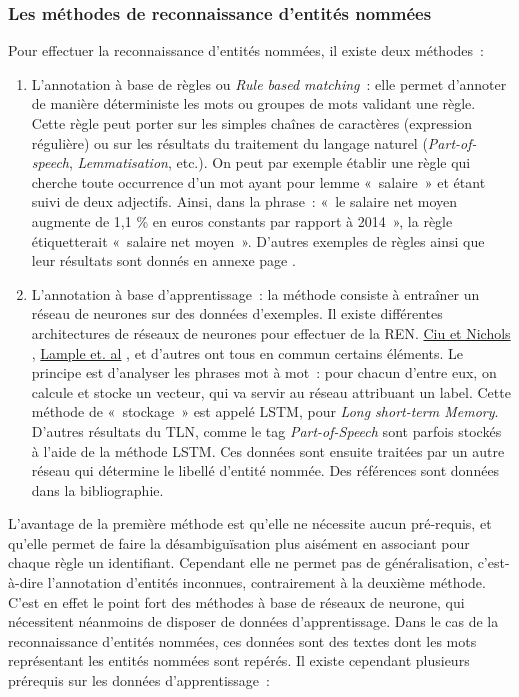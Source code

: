 \subsubsection*{Les méthodes de reconnaissance d'entités nommées}
Pour effectuer la reconnaissance d'entités nommées, il existe deux méthodes~: 
\begin{enumerate}
    \item L'annotation à base de règles ou \textit{Rule based matching}~: elle permet d'annoter de manière déterministe les mots ou groupes de mots validant une règle. Cette règle peut porter sur les simples chaînes de caractères (expression régulière) ou sur les résultats du traitement du langage naturel (\textit{Part-of-speech}, \textit{Lemmatisation}, etc.). On peut par exemple établir une règle qui cherche toute occurrence d'un mot ayant pour lemme «~salaire~» et étant suivi de deux adjectifs. Ainsi, dans la phrase~: «~le salaire net moyen augmente de 1,1 \% en euros constants par rapport à 2014~», la règle étiquetterait «~salaire net moyen~». D'autres exemples de règles ainsi que leur résultats sont donnés en annexe page \pageref{rule-exemple}.
    \vspace{5pt}
    \item L'annotation à base d'apprentissage~: la méthode consiste à entraîner un réseau de neurones sur des données d'exemples. Il existe différentes architectures de réseaux de neurones pour effectuer de la REN. \href{https://www.aclweb.org/anthology/Q16-1026}{Ciu et Nichols} \cite{chiu-nichols}, \href{https://www.aclweb.org/anthology/N16-1030}{Lample et. al} \cite{lampe-al}, et d'autres ont tous en commun certains éléments. Le principe est d'analyser les phrases mot à mot~: pour chacun d'entre eux, on calcule et stocke un vecteur, qui va servir au réseau attribuant un label. Cette méthode de «~stockage~» est appelé LSTM, pour \textit{Long short-term Memory}. D'autres résultats du TLN, comme le tag \textit{Part-of-Speech} sont parfois stockés à l'aide de la méthode LSTM. Ces données sont ensuite traitées par un autre réseau qui détermine le libellé d'entité nommée. Des références sont données dans la bibliographie.
    \newline
\end{enumerate}

L'avantage de la première méthode est qu'elle ne nécessite aucun pré-requis, et qu'elle permet de faire la désambiguïsation plus aisément en associant pour chaque règle un identifiant. Cependant elle ne permet pas de généralisation, c'est-à-dire l'annotation d'entités inconnues, contrairement à la deuxième méthode. C'est en effet le point fort des méthodes à base de réseaux de neurone, qui nécessitent néanmoins de disposer de données d'apprentissage. Dans le cas de la reconnaissance d'entités nommées, ces données sont des textes dont les mots représentant les entités nommées sont repérés. Il existe cependant plusieurs prérequis sur les données d'apprentissage~:
\newline

